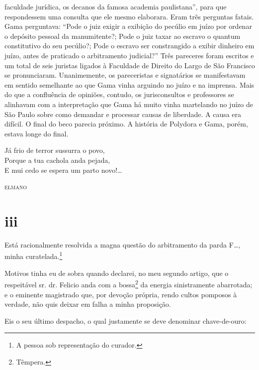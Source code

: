 \begin{didascalia}
{faculdade jurídica, os decanos da famosa academia paulistana'', para que
respondessem uma consulta que ele mesmo elaborara. Eram três perguntas
fatais. Gama perguntava: ``Pode o juiz exigir a exibição do pecúlio em
juízo por ordenar o depósito pessoal da manumitente?; Pode o juiz taxar
ao escravo o quantum constitutivo do seu pecúlio?; Pode o escravo ser
constrangido a exibir dinheiro em juízo, antes de praticado o
arbitramento judicial?'' Três pareceres foram escritos e um total de seis
juristas ligados à Faculdade de Direito do Largo de São Francisco se
pronunciaram. Unanimemente, os pareceristas e signatários se
manifestavam em sentido semelhante ao que Gama vinha arguindo no juízo e
na imprensa. Mais do que a confluência de opiniões, contudo, os
jurisconsultos e professores se alinhavam com a interpretação que Gama
há muito vinha martelando no juízo de São Paulo sobre como demandar e
processar causas de liberdade. A causa era difícil. O final do beco
parecia próximo. A história de Polydora e Gama, porém, estava longe do
final.}
\end{didascalia}

\epigraph{Já frio de terror sussurra o povo,\\
Porque a tua cachola anda pejada,\footnotemark\\
E mui cedo se espera um parto novo!\ldots{}}{\textsc{elmano}\footnotemark}



\section{iii}

Está racionalmente resolvida a magna questão do arbitramento da parda
F\ldots{}, minha curatelada.\footnote{ A pessoa sob representação do
  curador.}

Motivos tinha eu de sobra quando declarei, no meu segundo artigo, que o
respeitável sr. dr. Felicio anda com a bossa\footnote{ Têmpera.} da
energia sinistramente abarrotada; e o eminente magistrado que, por
devoção própria, rendo cultos pomposos à verdade, não quis deixar em
falha a minha proposição.

Eis o seu último despacho, o qual justamente se deve denominar
chave-de-ouro:

